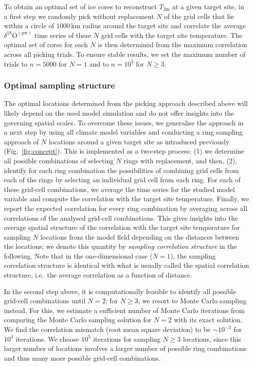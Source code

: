 \documentclass[cp, manuscript, draft]{copernicus}
\begin{document}
To obtain an optimal set of ice cores to reconstruct $T_{2\mathrm{m}}$ at a
given target site, in a first step we randomly pick without replacement $N$ of
the grid cells that lie within a circle of $1000$\,km radius around the target
site and correlate the average $\delta^{18}\mathrm{O}^{\mathrm{(pw)}}$ time
series of these $N$ grid cells with the target site temperature. The optimal set
of cores for each $N$ is then determined from the maximum correlation across all
picking trials. To ensure stable results, we set the maximum number of trials to
$n=5000$ for $N=1$ and to $n=10^5$ for $N\geq3$.

\subsubsection{Optimal sampling structure}\label{methods:opt.sampling}

The optimal locations determined from the picking approach described above will
likely depend on the used model simulation and do not offer insights into the
governing spatial scales. To overcome these issues, we generalise the approach
in a next step by using all climate model variables and conducting a ring
sampling approach of $N$ locations around a given target site as introduced
previously (Fig.~\ref{fig:concept}). This is implemented as a two-step process:
(1) we determine all possible combinations of selecting $N$ rings with
replacement, and then, (2), identify for each ring combination the possibilities
of combining grid cells from each of the rings by selecting an individual grid
cell from each ring. For each of these grid-cell combinations, we average the
time series for the studied model variable and compute the correlation with the
target site temperature. Finally, we report the expected correlation for every
ring combination by averaging across all correlations of the analysed grid-cell
combinations. This gives insights into the average spatial structure of the
correlation with the target site temperature for sampling $N$ locations from the
model field depending on the distances between the locations; we denote this
quantity by \emph{sampling correlation structure} in the following. Note that in
the one-dimensional case ($N=1$), the sampling correlation structure is
identical with what is usually called the spatial correlation structure, i.e.\
the average correlation as a function of distance.

In the second step above, it is computationally feasible to identify all
possible grid-cell combinations until $N=2$; for $N\geq3$, we resort to Monte
Carlo sampling instead. For this, we estimate a sufficient number of Monte Carlo
iterations from comparing the Monte Carlo sampling solution for $N=2$ with its
exact solution. We find the correlation mismatch (root mean square deviation) to
be $\sim10^{-3}$ for $10^4$ iterations. We choose $10^5$ iterations for sampling
$N\geq3$ locations, since this larger number of locations involves a larger
number of possible ring combinations and thus many more possible grid-cell
combinations.
\end{document}
